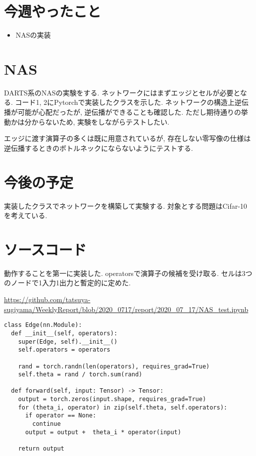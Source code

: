 \documentclass[twocolumn]{jarticle}     %
\begin{document}


\section{今週やったこと}
\begin{itemize}
	\item {NASの実装}
\end{itemize}

\section{NAS}
DARTS系のNASの実験をする.
ネットワークにはまずエッジとセルが必要となる.
コード1, 2にPytorchで実装したクラスを示した.
ネットワークの構造上逆伝播が可能が心配だったが,
逆伝播ができることも確認した.
ただし期待通りの挙動かは分からないため,
実験をしながらテストしたい.

エッジに渡す演算子の多くは既に用意されているが, 存在しない零写像の仕様は逆伝播するときのボトルネックにならないようにテストする.

\section{今後の予定}
実装したクラスでネットワークを構築して実験する.
対象とする問題はCifar-10を考えている.


\section{ソースコード}

動作することを第一に実装した.
operatorsで演算子の候補を受け取る.
セルは3つのノードで1入力1出力と暫定的に定めた.

\url{https://github.com/tatsuya-sugiyama/WeeklyReport/blob/2020_0717/report/2020_07_17/NAS_test.ipynb}

\begin{lstlisting}[caption=Edge,label=Edge]
class Edge(nn.Module):
  def __init__(self, operators):
    super(Edge, self).__init__()
    self.operators = operators

    rand = torch.randn(len(operators), requires_grad=True)
    self.theta = rand / torch.sum(rand)

  def forward(self, input: Tensor) -> Tensor:
    output = torch.zeros(input.shape, requires_grad=True)
    for (theta_i, operator) in zip(self.theta, self.operators):
      if operator == None:
        continue
      output = output +  theta_i * operator(input)

    return output
\end{lstlisting}
\end{document}
